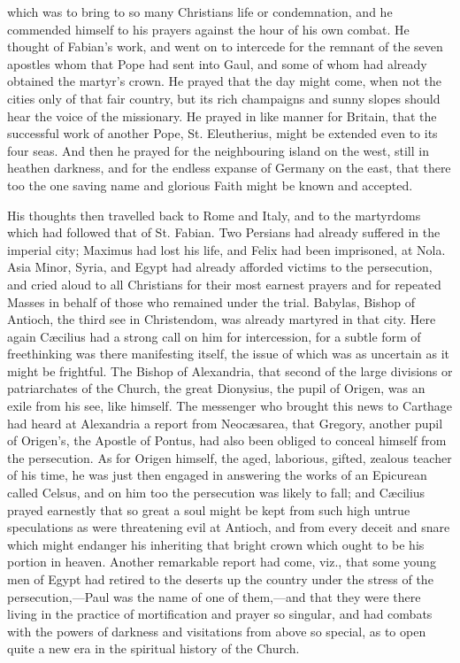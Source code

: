 which was to bring to so many Christians life or condemnation, and he
commended himself to his prayers against the hour of his own combat.
He thought of Fabian's work, and went on to intercede for the remnant
of the seven apostles whom that Pope had sent into Gaul, and some of
whom had already obtained the martyr's crown. He prayed that the day
might come, when not the cities only of that fair country, but its
rich champaigns and sunny slopes should hear the voice of the
missionary. He prayed in like manner for Britain, that the successful
work of another Pope, St. Eleutherius, might be extended even to its
four seas. And then he prayed for the neighbouring island on the west,
still in heathen darkness, and for the endless expanse of Germany on
the east, that there too the one saving name and glorious Faith might
be known and accepted.

His thoughts then travelled back to Rome and Italy, and to the
martyrdoms which had followed that of St. Fabian. Two Persians had
already suffered in the imperial city; Maximus had lost his life, and
Felix had been imprisoned, at Nola. Asia Minor, Syria, and Egypt had
already afforded victims to the persecution, and cried aloud to
all Christians for their most earnest prayers and for repeated Masses
in behalf of those who remained under the trial. Babylas, Bishop of
Antioch, the third see in Christendom, was already martyred in that
city. Here again Cæcilius had a strong call on him for intercession,
for a subtle form of freethinking was there manifesting itself, the
issue of which was as uncertain as it might be frightful. The Bishop
of Alexandria, that second of the large divisions or patriarchates of
the Church, the great Dionysius, the pupil of Origen, was an exile
from his see, like himself. The messenger who brought this news to
Carthage had heard at Alexandria a report from Neocæsarea, that
Gregory, another pupil of Origen's, the Apostle of Pontus, had also
been obliged to conceal himself from the persecution. As for Origen
himself, the aged, laborious, gifted, zealous teacher of his time, he
was just then engaged in answering the works of an Epicurean called
Celsus, and on him too the persecution was likely to fall; and
Cæcilius prayed earnestly that so great a soul might be kept from
such high untrue speculations as were threatening evil at Antioch, and
from every deceit and snare which might endanger his inheriting that
bright crown which ought to be his portion in heaven. Another
remarkable report had come, viz., that some young men of Egypt had
retired to the deserts up the country under the stress of the
persecution,—Paul was the name of one of them,—and that they were
there living in the practice of mortification and prayer so singular,
and had combats with the powers of darkness and visitations from
above so special, as to open quite a new era in the spiritual history
of the Church.

